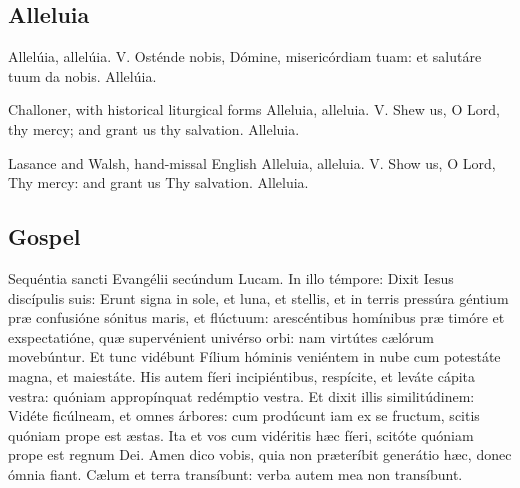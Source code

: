\subsection{Alleluia}
\label{proper-alleluia}

\begin{latinproper}
Allelúia, allelúia. V. Osténde nobis, Dómine, misericórdiam tuam: et salutáre tuum da nobis. Allelúia.
\end{latinproper}

\begin{englishwitness}{Challoner, with historical liturgical forms}
Alleluia, alleluia. V. Shew us, O Lord, thy mercy; and grant us thy salvation. Alleluia.
\end{englishwitness}

\begin{englishwitness}{Lasance and Walsh, hand-missal English}
Alleluia, alleluia. V. Show us, O Lord, Thy mercy: and grant us Thy salvation. Alleluia.
\end{englishwitness}

\subsection{Gospel}
\label{proper-gospel}

\begin{latinproper}
Sequéntia sancti Evangélii secúndum Lucam. In illo témpore: Dixit Iesus discípulis suis: Erunt signa in sole, et luna, et stellis, et in terris pressúra géntium præ confusióne sónitus maris, et flúctuum: arescéntibus homínibus præ timóre et exspectatióne, quæ supervénient univérso orbi: nam virtútes cælórum movebúntur. Et tunc vidébunt Fílium hóminis veniéntem in nube cum potestáte magna, et maiestáte. His autem fíeri incipiéntibus, respícite, et leváte cápita vestra: quóniam appropínquat redémptio vestra. Et dixit illis similitúdinem: Vidéte ficúlneam, et omnes árbores: cum prodúcunt iam ex se fructum, scitis quóniam prope est æstas. Ita et vos cum vidéritis hæc fíeri, scitóte quóniam prope est regnum Dei. Amen dico vobis, quia non præteríbit generátio hæc, donec ómnia fiant. Cælum et terra transíbunt: verba autem mea non transíbunt.
\end{latinproper}

